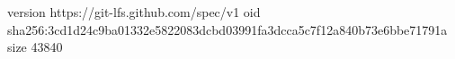 version https://git-lfs.github.com/spec/v1
oid sha256:3cd1d24c9ba01332e5822083dcbd03991fa3dcca5c7f12a840b73e6bbe71791a
size 43840
